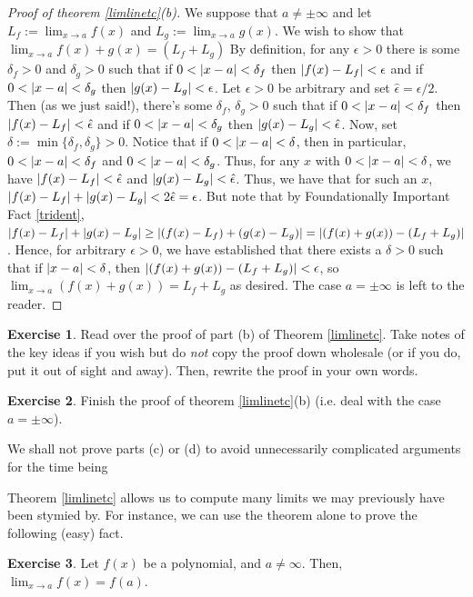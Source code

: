 \documentclass[english]{book}
\DeclarePairedDelimiter\abs{\lvert}{\rvert}%
\theoremstyle{remark}
\theoremstyle{definition}
\newtheorem{excs}{Exercise}
\newtheorem*{next week}{Next Week}
\newcommand{\dlim}{\displaystyle\lim}
\begin{document}
\begin{proof}[Proof of theorem \ref{limlinetc}(b)]
	We suppose that $a\neq \pm \infty$ and let $L_f:=\dlim_{x\to a} f(x)$ and $L_g:=\dlim_{x\to a} g(x)$. We wish to show that $\lim_{x\to a}f(x)+g(x)=(L_f+L_g)$ By definition, for any $\epsilon>0$ there is some $\delta_f>0$ and $\delta_g>0$ such that if $0<\abs{x-a}<\delta_f$ then $\abs{f(x)-L_f}<\epsilon $ and if $0<\abs{x-a}<\delta_g$ then $\abs{g(x)-L_g}<\epsilon $. Let $\epsilon>0$ be arbitrary and set $\hat{\epsilon}=\epsilon/2$. Then (as we just said!), there's some $\delta_f$, $\delta_g>0$ such that if $0<\abs{x-a}<\delta_f$ then $\abs{f(x)-L_f}<\hat{\epsilon}$ and if $0<\abs{x-a}<\delta_g$ then $\abs{g(x)-L_g}<\hat{\epsilon}$. Now, set $\delta:=\min\{\delta_f,\delta_g\}>0$. Notice that if $0<\abs{x-a}<\delta$, then in particular, $0<\abs{x-a}<\delta_f$ and $0<\abs{x-a}<\delta_g$. Thus, for any $x$ with $0<\abs{x-a}<\delta$, we have $\abs{f(x)-L_f}<\hat{\epsilon}$ and $\abs{g(x)-L_g}<\hat{\epsilon}$. Thus, we have that for such an $x$, $\abs{f(x)-L_f}+\abs{g(x)-L_g}<2\hat\epsilon=\epsilon$. But note that by Foundationally Important Fact \ref{trident}, $\abs{f(x)-L_f}+\abs{g(x)-L_g}\geq \abs{(f(x)-L_f)+(g(x)-L_g)}=\abs{(f(x)+g(x))-(L_f+L_g)}$. Hence, for arbitrary $\epsilon>0$, we have established that there exists a $\delta>0$ such that if $\abs{x-a}<\delta$, then $\abs{(f(x)+g(x))-(L_f+L_g)}<\epsilon$, so $\dlim_{x\to a} (f(x)+g(x))=L_f+L_g$ as desired. The case $a=\pm \infty$ is left to the reader.
\end{proof}
\begin{excs}
Read over the proof of part (b) of Theorem \ref{limlinetc}. Take notes of the key ideas if you wish but do \emph{not} copy the proof down wholesale (or if you do, put it out of sight and away). Then, rewrite the proof in your own words.
\end{excs}
\begin{excs}
Finish the proof of theorem \ref{limlinetc}(b) (i.e. deal with the case $a=\pm \infty$).
\end{excs}
We shall not prove parts (c) or (d) to avoid unnecessarily complicated arguments for the time being\textellipsis

Theorem \ref{limlinetc} allows us to compute many limits we may previously have been stymied by. For instance, we can use the theorem alone to prove the following (easy) fact.
\begin{excs}\label{polycont}
	Let $f(x)$ be a polynomial, and $a\neq \infty$. Then, $\dlim_{x\to a} f(x)=f(a)$.
\end{excs}
\end{document}
